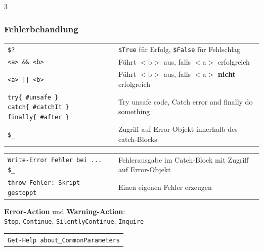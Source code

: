 \documentclass[
11pt,
footheight=40pt
]{scrartcl}
\newif \iffehlerbehandlung \fehlerbehandlungtrue
\newif \ifregularexpressions \regularexpressionstrue
\begin{document}
\begin{paracol}{3}
	\iffehlerbehandlung 
	\subsubsection*{Fehlerbehandlung}
	\begin{tabular}{p{0.43\linewidth} p{0.57\linewidth}}
	\rowcolor{lightblue} \texttt{\$?} & \texttt{\$True} für Erfolg, \texttt{\$False} für Fehlschlag \\
	\texttt{<a> \&\& <b>} & Führt $<$b$>$ aus, falls $<$a$>$ erfolgreich \\
	\rowcolor{lightblue} \texttt{<a> || <b>} & Führt $<$b$>$ aus, falls $<$a$>$ \textbf{nicht} erfolgreich \\
	\texttt{try\{~\#unsafe \} catch\{~\#catchIt \} finally\{~\#after \}} & Try unsafe code, Catch error and finally do something \\
	\rowcolor{lightblue} \texttt{\$\_} & Zugriff auf Error-Objekt innerhalb des catch-Blocks \\
	\end{tabular}

	\fi
	\switchcolumn
	\begin{tabular}{p{0.43\linewidth} p{0.57\linewidth}}
		\rowcolor{lightblue} \texttt{Write-Error \dq Fehler bei ... \$\_\dq} & Fehlerausgabe im Catch-Block mit Zugriff auf Error-Objekt \\
		\texttt{throw \dq Fehler: Skript gestoppt} & Einen eigenen Fehler erzeugen \\
	\end{tabular}
	
	\textbf{Error-Action} und \textbf{Warning-Action}: \\\texttt{Stop}, \texttt{Continue}, \texttt{SilentlyContinue}, \texttt{Inquire} \\
	\begin{tabular}{p{1.05\linewidth }}
	    \rowcolor{lightblue} \texttt{Get-Help about\_CommonParameters} \\ 
	\end{tabular} 
	\ifregularexpressions 

\end{paracol}
\end{document}

